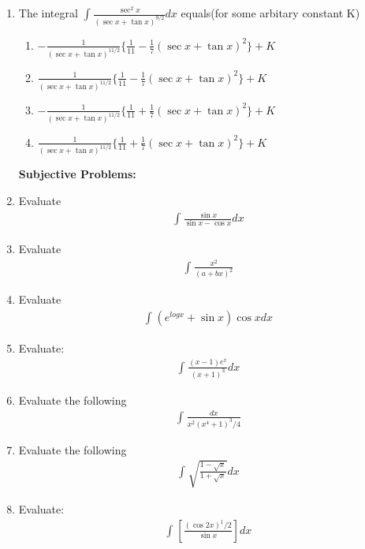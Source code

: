 \begin{enumerate}[label=\arabic*.,ref=\thesubsection.\theenumi]
\item The integral $\int_{}\frac{\sec^{2}x}{(\sec x + \tan x)^{9/2}}dx$ equals(for some arbitary constant K)
\begin{enumerate}
\item $-\frac{1}{(\sec x + \tan x)^{11/2}}\{\frac{1}{11} - \frac{1}{7}(\sec x + \tan x)^2\} + K$
\item $\frac{1}{(\sec x + \tan x)^{11/2}}\{\frac{1}{11} - \frac{1}{7}(\sec x + \tan x)^2\} + K$
\item $-\frac{1}{(\sec x + \tan x)^{11/2}}\{\frac{1}{11} + \frac{1}{7}(\sec x + \tan x)^2\} + K$
\item $\frac{1}{(\sec x + \tan x)^{11/2}}\{\frac{1}{11} + \frac{1}{7}(\sec x + \tan x)^2\} + K$
\end{enumerate}

\textbf{Subjective Problems:}

\item Evaluate 
\begin{align*}
\int_{}\frac{\sin x}{\sin x - \cos x}dx
\end{align*}

\item Evaluate 
\begin{align*}
\int_{}\frac{x^2}{(a + bx)^2}
\end{align*}

\item Evaluate 
\begin{align*}
\int_{}(e^{log x} + \sin x)\cos x dx
\end{align*}

\item Evaluate: 
\begin{align*}
\int_{}\frac{(x - 1)e^x}{(x + 1)^3}dx
\end{align*}

\item Evaluate the following 
\begin{align*}
\int_{}\frac{dx}{x^2(x^4 + 1)^3/4}
\end{align*}

\item Evaluate the following 
\begin{align*}
\int_{}\sqrt{\frac{1 - \sqrt{x}}{1 + \sqrt{x}}}dx
\end{align*}

\item Evaluate: 
\begin{align*}
\int_{}[\frac{(\cos2x)^1/2}{\sin x}]dx
\end{align*}


\end{enumerate}
